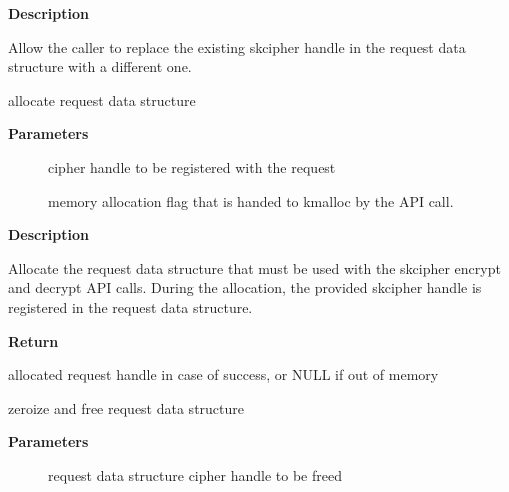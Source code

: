 \documentclass[a4paper,8pt,english]{sphinxmanual}
\begin{document}
\textbf{Description}

Allow the caller to replace the existing skcipher handle in the request
data structure with a different one.

\begin{fulllineitems}
\label{crypto/api-skcipher:c.skcipher_request_alloc}
allocate request data structure

\end{fulllineitems}


\textbf{Parameters}
\begin{description}
\item[{}] \leavevmode
cipher handle to be registered with the request

\item[{}] \leavevmode
memory allocation flag that is handed to kmalloc by the API call.

\end{description}

\textbf{Description}

Allocate the request data structure that must be used with the skcipher
encrypt and decrypt API calls. During the allocation, the provided skcipher
handle is registered in the request data structure.

\textbf{Return}

allocated request handle in case of success, or NULL if out of memory

\begin{fulllineitems}
\label{crypto/api-skcipher:c.skcipher_request_free}
zeroize and free request data structure

\end{fulllineitems}


\textbf{Parameters}
\begin{description}
\item[{}] \leavevmode
request data structure cipher handle to be freed

\end{description}
\end{document}
